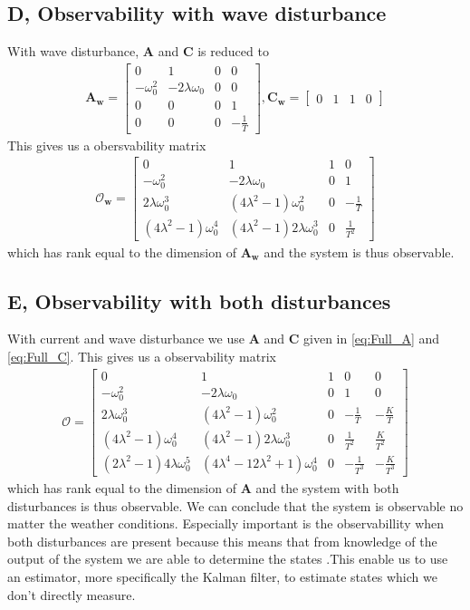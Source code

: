 \subsection{D, Observability with wave disturbance}
With wave disturbance, $\mathbf{A}$ and $\mathbf{C}$ is reduced to 
\begin{align*}
    \mathbf{A_w} = 
    \begin{bmatrix}
        0 & 1 & 0 & 0\\
        -\omega_0^2 & -2\lambda\omega_0 & 0 & 0\\
        0 & 0 & 0 & 1\\
        0 & 0 & 0& -\frac{1}{T}
    \end{bmatrix}
    ,
    \mathbf{C_w} =  
    \begin{bmatrix}
        0 & 1 & 1 & 0
    \end{bmatrix}
\end{align*}
This gives us a obersvability matrix
\begin{align}
    \mathbf{\mathcal{O}_w} =
    \begin{bmatrix}
        0 & 1 & 1 & 0\\
        -\omega_0^2 & -2\lambda\omega_0 & 0 & 1\\
        2\lambda\omega_0^3 & (4\lambda^2-1)\omega_0^2 & 0 & -\frac{1}{T}\\
        (4\lambda^2-1)\omega_0^4 & (4\lambda^2-1)2\lambda\omega_0^3 & 0 & \frac{1}{T^2}
    \end{bmatrix}
\end{align}
which has rank equal to the dimension of $\mathbf{A_w}$ and the system is thus observable.
\subsection{E, Observability with both disturbances}
With current and wave disturbance we use $\mathbf{A}$ and $\mathbf{C}$ given in \cref{eq:Full_A} and \cref{eq:Full_C}. This gives us a observability matrix
\begin{align}
    \mathbf{\mathcal{O}} = 
    \begin{bmatrix}
        0 & 1 & 1 & 0 & 0\\
        -\omega_0^2 & -2\lambda\omega_0 & 0 & 1 & 0\\
        2\lambda\omega_0^3 & (4\lambda^2-1)\omega_0^2 & 0 & -\frac{1}{T} & -\frac{K}{T}\\
        (4\lambda^2-1)\omega_0^4 & (4\lambda^2-1)2\lambda\omega_0^3 & 0 & \frac{1}{T^2} & \frac{K}{T^2}\\
        (2\lambda^2-1)4\lambda\omega_0^5 & (4\lambda^4-12\lambda^2+1)\omega_0^4 & 0 & -\frac{1}{T^3} & -\frac{K}{T^3}
    \end{bmatrix}
\end{align}
which has rank equal to the dimension of $\mathbf{A}$ and the system with both disturbances is thus observable.
We can conclude that the system is observable no matter the weather conditions. Especially important is the observabillity when both disturbances are present because this means that from knowledge of the output of the system we are able to determine the states \cite{Chen2014}.This enable us to use an estimator, more specifically the Kalman filter, to estimate states which we don't directly measure.  